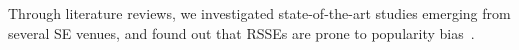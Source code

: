 Through literature reviews, we investigated state-of-the-art studies emerging from %
several SE venues, and found out that RSSEs %
are prone to popularity bias~\cite{10174041}.%
